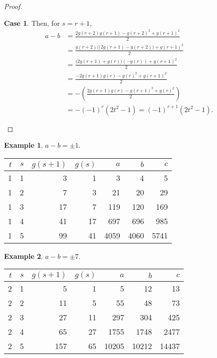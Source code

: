 \documentclass{article}
\theoremstyle{definition}
\newtheorem{example}{Example}[section]
\newtheorem{case}{Case}[section]
\begin{document}
\begin{proof}
\begin{case}
Then, for \(s = r+1\),
\[ \begin{aligned}
a - b &=\frac{2 g(r+2) g(r+1)-g(r+2)^2+g(r+1)^2}{2} \\
&= \frac{g(r+2)\big((2 g(r+1)-g(r+2)\big)+g(r+1)^2}{2} \\
&= \frac{\big(2 g(r+1)+g(r)\big)(-g(r))+g(r+1)^2}{2} \\
&= \frac{-2 g(r+1) g(r)-g(r)^2+g(r+1)^2}{2} \\
&=-\left(\frac{2 g(r+1) g(r)-g(r+1)^2+g(r)^2}{2}\right) \\
&=-(-1)^r(2t^2-1) = (-1)^{r+1}(2t^2-1).
\end{aligned} \]
\end{case}
\end{proof}

\begin{example}
\( a - b = \pm 1\).

\smallskip

\begin{minipage}{0.9\textwidth}
\centering
\begin{tabular}{rr|rr|rrr}
\(t\) & \(s\) & \(g(s+1)\) & \(g(s)\) & \(a\) & \(b\) & \(c\) \\ \hline
1 & 1 & 3 & 1 &   3 &  4 &  5 \\
1 & 2 & 7 & 3 &  21 & 20 & 29 \\
1 & 3 &17 & 7 & 119 &120 &169 \\
1 & 4 &41 &17 & 697 &696 &985 \\
1 & 5 &99 &41 &4059&4060&5741
\end{tabular}
\end{minipage}
\label{tab:example}
\end{example}

\begin{example}
\( a - b = \pm 7\).

\smallskip

\begin{minipage}{0.9\textwidth}
\centering
\begin{tabular}{rr|rr|rrr}
\(t\) & \(s\) & \(g(s+1)\) & \(g(s)\) & \(a\) & \(b\) & \(c\) \\ \hline
2 & 1 & 5 & 1 &   5 & 12 & 13 \\
2 & 2 &11 & 5 &  55 & 48 & 73 \\
2 & 3 &27 &11 & 297 &304 &425 \\
2 & 4 &65 &27 &1755&1748&2477 \\
2 & 5 &157&65 &10205&10212&14437
\end{tabular}
\end{minipage}
\end{example}
\end{document}
